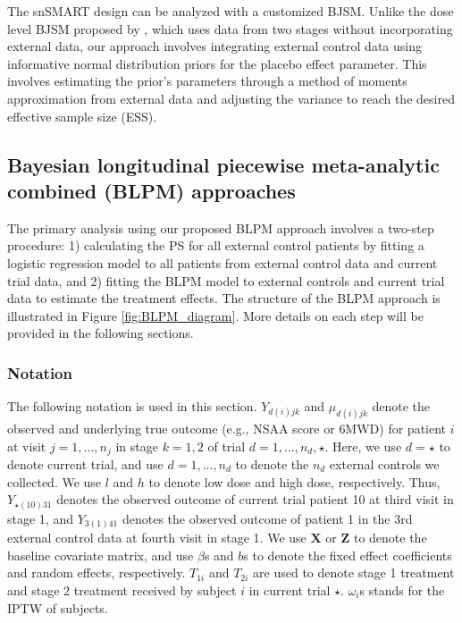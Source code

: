 The \ac{snSMART} design can be analyzed with a customized \ac{BJSM}. Unlike the dose level \ac{BJSM} proposed by \cite{fang2023comparing}, which uses data from two stages without incorporating external data, our approach involves integrating external control data using informative normal distribution priors for the placebo effect parameter. This involves estimating the prior's parameters through a method of moments approximation from external data and adjusting the variance to reach the desired effective sample size (\ac{ESS}).

\subsection{Bayesian longitudinal piecewise meta-analytic combined (BLPM) approaches}
The primary analysis using our proposed \ac{BLPM} approach involves a two-step procedure: 1) calculating the \ac{PS} \citep{rosenbaum1983central} for all external control patients by fitting a logistic regression model to all patients from external control data and current trial data, and 2) fitting the \ac{BLPM} model to external controls and current trial data to estimate the treatment effects. The structure of the \ac{BLPM} approach is illustrated in Figure \ref{fig:BLPM_diagram}. More details on each step will be provided in the following sections.


\subsubsection{Notation}
The following notation is used in this section. $Y_{d(i)jk}$ and $\mu_{d(i)jk}$ denote the observed and underlying true outcome (e.g., \ac{NSAA} score or \ac{6MWD}) for patient $i$ at visit $j = 1,...,n_j$ in stage $k = 1, 2$ of trial $d = 1,...,n_d,\star$. Here, we use $d = \star$ to denote current trial, and use $d = 1,...,n_d$ to denote the $n_d$ external controls we collected. We use $l$ and $h$ to denote low dose and high dose, respectively. Thus, $Y_{\star(10)31}$ denotes the observed outcome of current trial patient 10 at third visit in stage 1, and $Y_{3(1)41}$ denotes the observed outcome of patient 1 in the 3rd external control data at fourth visit in stage 1. We use $\boldsymbol{X}$ or $\boldsymbol{Z}$ to denote the baseline covariate matrix, and use $\beta$s and $b$s to denote the fixed effect coefficients and random effects, respectively. $T_{1i}$ and $T_{2i}$ are used to denote stage 1 treatment and stage 2 treatment received by subject $i$ in current trial $\star$. $\omega_i$s stands for the \ac{IPTW} of subjects.


